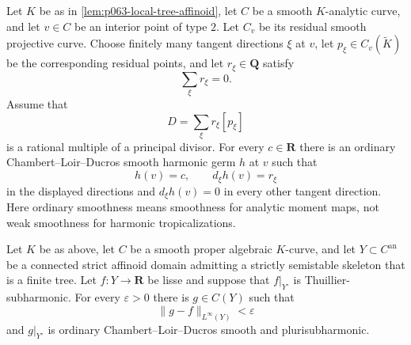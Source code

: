 \begin{lemma}
\label{lem:p063-principal-residual-germ}
Let $K$ be as in \cref{lem:p063-local-tree-affinoid}, let $C$ be a smooth
$K$-analytic curve, and let $v\in C$ be an interior point of type $2$.
Let $C_v$ be its residual smooth projective curve.  Choose finitely many
tangent directions $\xi$ at $v$, let $p_\xi\in C_v(\widetilde K)$ be the
corresponding residual points, and let $r_\xi\in\mathbf Q$ satisfy
\begin{equation}
\label{eq:p063-residual-degree-zero}
                         \sum_\xi r_\xi=0.
\end{equation}
Assume that
\[
                         D=\sum_\xi r_\xi[p_\xi]
\]
is a rational multiple of a principal divisor.  For every $c\in\mathbf R$
there is an ordinary Chambert--Loir--Ducros smooth harmonic germ $h$ at
$v$ such that
\begin{equation}
\label{eq:p063-prescribed-residual-slopes}
                    h(v)=c,
                    \qquad
                    d_\xi h(v)=r_\xi
\end{equation}
in the displayed directions and $d_\xi h(v)=0$ in every other tangent
direction.  Here ordinary smoothness means smoothness for analytic moment
maps, not weak smoothness for harmonic tropicalizations.
\end{lemma}

\begin{proposition}
\label{prop:p063-tree-lisse-ordinary-regularization}
Let $K$ be as above, let $C$ be a smooth proper algebraic $K$-curve, and
let $Y\subset C^{\mathrm{an}}$ be a connected strict affinoid domain
admitting a strictly semistable skeleton that is a finite tree.  Let
$f:Y\to\mathbf R$ be lisse and suppose that $f|_{Y^\circ}$ is
Thuillier-subharmonic.  For every $\varepsilon>0$ there is $g\in C(Y)$
such that
\begin{equation}
\label{eq:p063-lisse-uniform-regularization}
             \lVert g-f\rVert_{L^\infty(Y)}<\varepsilon
\end{equation}
and $g|_{Y^\circ}$ is ordinary Chambert--Loir--Ducros smooth and
plurisubharmonic.
\end{proposition}

